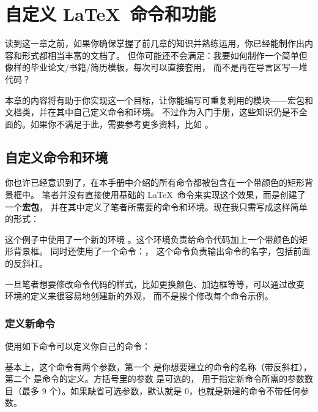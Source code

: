 \chapter{自定义 \LaTeX\ 命令和功能}\label{chap:custom}

\begin{intro}
读到这一章之前，如果你确保掌握了前几章的知识并熟练运用，你已经能制作出内容和形式都相当丰富的文档了。
但你可能还不会满足：我要如何制作一个简单但像样的毕业论文/书籍/简历模板，每次可以直接套用，
而不是再在导言区写一堆代码？

本章的内容将有助于你实现这一个目标，让你能编写可重复利用的模块——宏包和文档类，并在其中自己定义命令和环境。
不过作为入门手册，这些知识仍是不全面的。如果你不满足于此，需要参考更多资料，比如 \cite{companion,clsguide}。
\end{intro}

\section{自定义命令和环境}\label{sec:defs}

你也许已经意识到了，在本手册中介绍的所有命令都被包含在一个带颜色的矩形背景框中。
笔者并没有直接使用基础的 \LaTeX\ 命令来实现这个效果，而是创建了一个\textbf{宏包}，
并在其中定义了笔者所需要的命令和环境。现在我只需写成这样简单的形式：

\begin{example}
\begin{command}
\end{command}
\end{example}

这个例子中使用了一个新的环境 。这个环境负责给命令代码加上一个带颜色的矩形背景框。
同时还使用了一个命令：， 这个命令负责输出命令的名字，包括前面的反斜杠。

一旦笔者想要修改命令代码的样式，比如更换颜色、加边框等等，可以通过改变  环境的定义来很容易地创建新的外观，
而不是挨个修改每个命令示例。

\subsection{定义新命令}\label{subsec:newcmd}

使用如下命令可以定义你自己的命令：
\begin{command}
\end{command}
基本上，这个命令有两个参数，第一个  是你想要建立的命令的名称（带反斜杠），
第二个  是命令的定义。方括号里的参数  是可选的，
用于指定新命令所需的参数数目（最多 9 个）。如果缺省可选参数，默认就是 0，也就是新建的命令不带任何参数。

